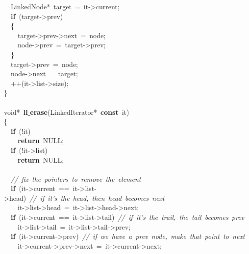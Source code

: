 \documentclass{article}
\begin{document}
\mbox{}\ \ LinkedNode*\ target\ =\ it-\textgreater{}current; \\
\mbox{}\ \ \textbf{if}\ (target-\textgreater{}prev) \\
\mbox{}\ \ \{ \\
\mbox{}\ \ \ \ target-\textgreater{}prev-\textgreater{}next\ =\ node; \\
\mbox{}\ \ \ \ node-\textgreater{}prev\ =\ target-\textgreater{}prev; \\
\mbox{}\ \ \} \\
\mbox{}\ \ target-\textgreater{}prev\ =\ node; \\
\mbox{}\ \ node-\textgreater{}next\ =\ target; \\
\mbox{}\ \ ++(it-\textgreater{}list-\textgreater{}size); \\
\mbox{}\} \\
\mbox{} \\
\mbox{}void*\ \textbf{ll$\_$erase}(LinkedIterator*\ \textbf{const}\ it) \\
\mbox{}\{ \\
\mbox{}\ \ \textbf{if}\ (!it) \\
\mbox{}\ \ \ \ \textbf{return}\ NULL; \\
\mbox{}\ \ \textbf{if}\ (!it-\textgreater{}list) \\
\mbox{}\ \ \ \ \textbf{return}\ NULL; \\
\mbox{} \\
\mbox{}\ \ \textit{//\ fix\ the\ pointers\ to\ remove\ the\ element} \\
\mbox{}\ \ \textbf{if}\ (it-\textgreater{}current\ ==\ it-\textgreater{}list-\textgreater{}head)\ \textit{//\ if\ it's\ the\ head,\ then\ head\ becomes\ next} \\
\mbox{}\ \ \ \ it-\textgreater{}list-\textgreater{}head\ =\ it-\textgreater{}list-\textgreater{}head-\textgreater{}next; \\
\mbox{}\ \ \textbf{if}\ (it-\textgreater{}current\ ==\ it-\textgreater{}list-\textgreater{}tail)\ \textit{//\ if\ it's\ the\ trail,\ the\ tail\ becomes\ prev} \\
\mbox{}\ \ \ \ it-\textgreater{}list-\textgreater{}tail\ =\ it-\textgreater{}list-\textgreater{}tail-\textgreater{}prev; \\
\mbox{}\ \ \textbf{if}\ (it-\textgreater{}current-\textgreater{}prev)\ \textit{//\ if\ we\ have\ a\ prev\ node,\ make\ that\ point\ to\ next} \\
\mbox{}\ \ \ \ it-\textgreater{}current-\textgreater{}prev-\textgreater{}next\ =\ it-\textgreater{}current-\textgreater{}next; \\
\end{document}
